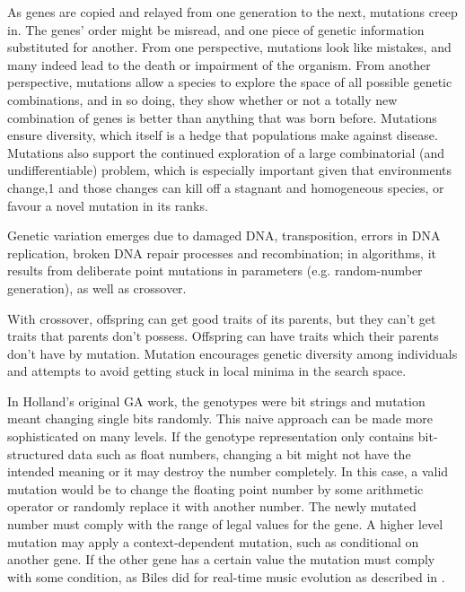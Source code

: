 
As genes are copied and relayed from one generation to the next, mutations creep in. The genes' order might be misread, and one piece of genetic information substituted for another. From one perspective, mutations look like mistakes, and many indeed lead to the death or impairment of the organism. From another perspective, mutations allow a species to explore the space of all possible genetic combinations, and in so doing, they show whether or not a totally new combination of genes is better than anything that was born before. Mutations ensure diversity, which itself is a hedge that populations make against disease. Mutations also support the continued exploration of a large combinatorial (and undifferentiable) problem, which is especially important given that environments change,1 and those changes can kill off a stagnant and homogeneous species, or favour a novel mutation in its ranks.

Genetic variation emerges due to damaged DNA, transposition, errors in DNA replication, broken DNA repair processes and recombination; in algorithms, it results from deliberate point mutations in parameters (e.g. random-number generation), as well as crossover.

With crossover, offspring can get good traits of its parents, but they can't get traits that parents don't possess.
Offspring can have traits which their parents don't have by mutation.  Mutation encourages genetic diversity among individuals and
attempts to avoid getting stuck in local minima in the search space.

In Holland's original GA work, the genotypes were bit strings and mutation meant changing single bits randomly. 
This naive approach can be made more sophisticated on many levels.
 If the genotype representation only contains bit-structured data such as float numbers, changing a bit might not have the intended meaning or it may destroy the number completely.  In this case, a valid mutation would be to change the floating point number by some arithmetic operator or randomly replace it with another number. The newly mutated number must comply with the range of legal values for the gene.
 A higher level mutation may apply a context-dependent mutation, such as conditional on another gene.  If the other gene has a certain value the mutation must comply with some condition, as Biles did for real-time music evolution as described in \cite{Bilesb2007}.

